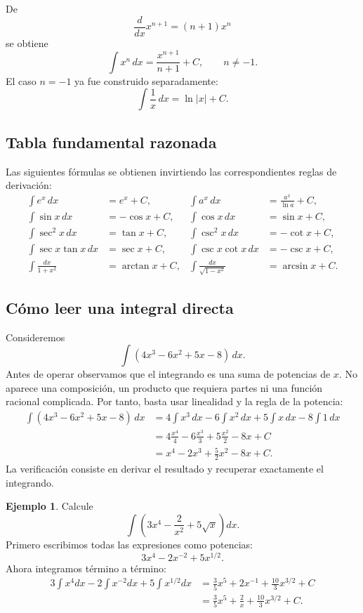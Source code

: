 \documentclass[12pt]{article}
\theoremstyle{definition}\newtheorem{definicion}[teorema]{Definición}\newtheorem{ejemplo}[teorema]{Ejemplo}\newtheorem{ejercicio}[teorema]{Ejercicio}
\theoremstyle{remark}\newtheorem*{observacion}{Observación}\newtheorem*{advertencia}{Advertencia}\newtheorem*{estrategia}{Estrategia}
\begin{document}
De
\[
\frac{d}{dx}x^{n+1}=(n+1)x^n
\]
se obtiene
\[
\boxed{\int x^n\,dx=\frac{x^{n+1}}{n+1}+C,\qquad n\neq-1.}
\]
El caso $n=-1$ ya fue construido separadamente:
\[
\boxed{\int\frac1x\,dx=\ln|x|+C.}
\]

\subsection{Tabla fundamental razonada}
Las siguientes fórmulas se obtienen invirtiendo las correspondientes reglas de derivación:
\begin{align*}
\int e^x\,dx&=e^x+C,&
\int a^x\,dx&=\frac{a^x}{\ln a}+C,\\
\int\sin x\,dx&=-\cos x+C,&
\int\cos x\,dx&=\sin x+C,\\
\int\sec^2x\,dx&=\tan x+C,&
\int\csc^2x\,dx&=-\cot x+C,\\
\int\sec x\tan x\,dx&=\sec x+C,&
\int\csc x\cot x\,dx&=-\csc x+C,\\
\int\frac{dx}{1+x^2}&=\arctan x+C,&
\int\frac{dx}{\sqrt{1-x^2}}&=\arcsin x+C.
\end{align*}

\subsection{Cómo leer una integral directa}
Consideremos
\[
\int(4x^3-6x^2+5x-8)\,dx.
\]
Antes de operar observamos que el integrando es una suma de potencias de $x$. No aparece una composición, un producto que requiera partes ni una función racional complicada. Por tanto, basta usar linealidad y la regla de la potencia:
\begin{align*}
\int(4x^3-6x^2+5x-8)\,dx
&=4\int x^3\,dx-6\int x^2\,dx+5\int x\,dx-8\int1\,dx\\
&=4\frac{x^4}{4}-6\frac{x^3}{3}+5\frac{x^2}{2}-8x+C\\
&=\boxed{x^4-2x^3+\frac52x^2-8x+C}.
\end{align*}
La verificación consiste en derivar el resultado y recuperar exactamente el integrando.

\begin{ejemplo}
Calcule
\[
\int\left(3x^4-\frac2{x^2}+5\sqrt{x}\right)dx.
\]
Primero escribimos todas las expresiones como potencias:
\[
3x^4-2x^{-2}+5x^{1/2}.
\]
Ahora integramos término a término:
\begin{align*}
3\int x^4dx-2\int x^{-2}dx+5\int x^{1/2}dx
&=\frac35x^5+2x^{-1}+\frac{10}{3}x^{3/2}+C\\
&=\boxed{\frac35x^5+\frac2x+\frac{10}{3}x^{3/2}+C}.
\end{align*}
\end{ejemplo}
\end{document}
